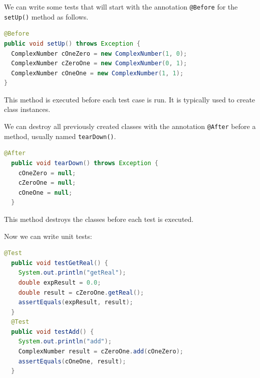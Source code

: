 \documentclass[11pt, xcolor=svgnames]{beamer}
\begin{document}

\begin{frame}[fragile]

We can write some tests that will start with the annotation \texttt{@Before} for the \texttt{setUp()} method as follows.

\begin{lstlisting}[language=Java,basicstyle=\tiny]
@Before
public void setUp() throws Exception {
  ComplexNumber cOneZero = new ComplexNumber(1, 0);
  ComplexNumber cZeroOne = new ComplexNumber(0, 1);
  ComplexNumber cOneOne = new ComplexNumber(1, 1);
}
\end{lstlisting}

This method is executed before each test case is run. It is typically used to create class instances.

\end{frame}


\begin{frame}[fragile]

  We can destroy all previously created classes with the annotation \texttt{@After} before a method, usually named \texttt{tearDown()}.
  
  \begin{lstlisting}[language=Java,basicstyle=\tiny]
  @After
  public void tearDown() throws Exception {
    cOneZero = null;
    cZeroOne = null;
    cOneOne = null;
  }
  \end{lstlisting}
  
  This method destroys the classes before each test is executed.
  
  \end{frame}


\begin{frame}[fragile]
Now we can write unit tests:
~

\begin{lstlisting}[language=Java,basicstyle=\tiny]
  @Test  
  public void testGetReal() {
    System.out.println("getReal");
    double expResult = 0.0;
    double result = cZeroOne.getReal();
    assertEquals(expResult, result);
  }
  @Test
  public void testAdd() {
    System.out.println("add");
    ComplexNumber result = cZeroOne.add(cOneZero);
    assertEquals(cOneOne, result);
  }
\end{lstlisting}
\end{frame}
\end{document}
